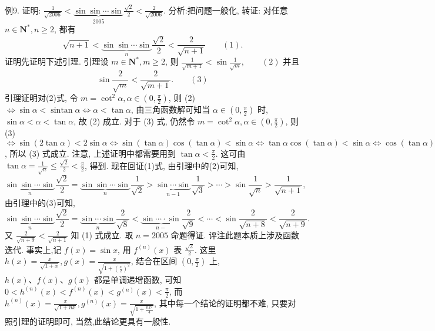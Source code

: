 例9. 证明: $\frac{1}{\sqrt{2006}}<\underbrace{\sin \sin \cdots \sin }_{2005 } \frac{\sqrt{2}}{2}<\frac{2}{\sqrt{2006}}$.
分析:把问题一般化, 转证: 对任意 $n \in \mathbf{N}^*, n \geqslant 2$, 都有
$$
\sqrt{n+1}<\underbrace{\sin \sin \cdots \sin }_{n } \frac{\sqrt{2}}{2}<\frac{2}{\sqrt{n+1}} \quad\quad(1).
$$
证明先证明下述引理.
引理设 $m \in \mathbf{N}^*, m \geqslant 2$, 则 $\frac{1}{\sqrt{m+1}}<\sin \frac{1}{\sqrt{m}}, \quad\quad(2)$
并且
$$
\sin \frac{2}{\sqrt{m}}<\frac{2}{\sqrt{m+1}} . \quad\quad(3)
$$
引理证明对(2)式, 令 $m=\cot ^2 \alpha, \alpha \in\left(0, \frac{\pi}{2}\right)$, 则 (2) $\Leftrightarrow \sin \alpha<\operatorname{sintan} \alpha \Leftrightarrow \alpha<\tan \alpha$, 由三角函数解可知当 $\alpha \in\left(0, \frac{\pi}{2}\right)$ 时, $\sin \alpha<\alpha<\tan \alpha$, 故 (2) 成立.
对于 (3) 式, 仍然令 $m=\cot ^2 \alpha, \alpha \in\left(0, \frac{\pi}{2}\right)$, 则 (3) $\Leftrightarrow \sin (2 \tan \alpha)< 2 \sin \alpha \Leftrightarrow \sin (\tan \alpha) \cos (\tan \alpha)<\sin \alpha \Leftrightarrow \tan \alpha \cos (\tan \alpha)<\sin \alpha \Leftrightarrow \cos (\tan \alpha)< \cos \alpha \Leftrightarrow \tan \alpha>\alpha$, 所以 (3) 式成立.
注意, 上述证明中都需要用到 $\tan \alpha<\frac{\pi}{2}$. 这可由 $\tan \alpha=\frac{1}{\sqrt{n}} \leqslant \frac{\sqrt{2}}{2}<\frac{\pi}{2}$, 得到.
现在回证(1)式, 由引理中的(2)可知,
$$
\underbrace{\sin \sin \cdots \sin }_{n } \frac{\sqrt{2}}{2}=\underbrace{\sin \sin \cdots \sin }_{n } \frac{1}{\sqrt{2}}>\underbrace{\sin \cdots \sin }_{n-1 } \frac{1}{\sqrt{3}}>\cdots>\sin \frac{1}{\sqrt{n}}>\frac{1}{\sqrt{n+1}},
$$
由引理中的(3)可知,
$$
\underbrace{\sin \sin \cdots \sin }_{n } \frac{\sqrt{2}}{2}=\underbrace{\sin \cdots \sin }_{n } \frac{2}{\sqrt{8}}<\underbrace{\sin \cdots \cdot \sin }_{n-} \frac{2}{\sqrt{9}}<\cdots<\sin \frac{2}{\sqrt{n+8}}<\frac{2}{\sqrt{n+9}} .
$$
又 $\frac{2}{\sqrt{n+9}}<\frac{2}{\sqrt{n+1}}$ 知 (1) 式成立.
取 $n=2005$ 命题得证.
评注此题本质上涉及函数迭代.
事实上,记 $f(x)=\sin x$, 用 $f^{(n)}(x)$ 表 $\frac{\sqrt{2}}{2}$. 这里 $h(x)=\frac{x}{\sqrt{1+x}}, g(x)=\frac{x}{\sqrt{1+\left(\frac{x}{2}\right)^2}}$, 结合在区间 $\left(0, \frac{\pi}{2}\right)$ 上, $h(x) 、 f(x) 、 g(x)$ 都是单调递增函数, 可知 $0<h^{(n)}(x)<f^{(n)}(x)< g^{(n)}(x)<\frac{\pi}{2}$, 而 $h^{(n)}(x)=\frac{x}{\sqrt{1+n x}}, g^{(n)}(x)=\frac{x}{\sqrt{1+\frac{n x^2}{4}}}$, 其中每一个结论的证明都不难, 只要对照引理的证明即可, 当然,此结论更具有一般性.



